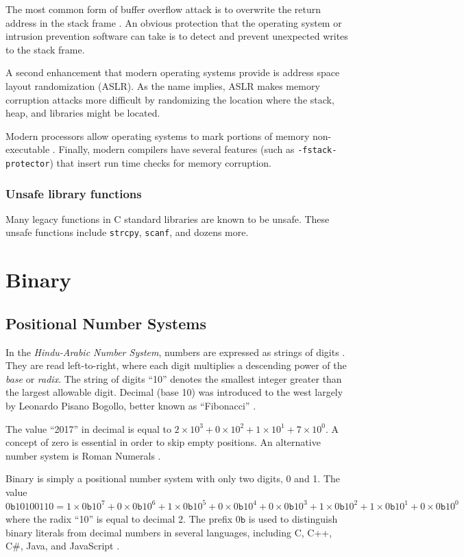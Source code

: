 \documentclass{book}
\begin{document}
The most common form of buffer overflow attack is to overwrite the return address in the stack frame \cite{apple}. An obvious protection that the operating system or intrusion prevention software can take is to detect and prevent unexpected writes to the stack frame.

A second enhancement that modern operating systems provide is address space layout randomization (ASLR). As the name implies, ASLR makes memory corruption attacks more difficult by randomizing the location where the stack, heap, and libraries might be located.

Modern processors allow operating systems to mark portions of memory non-executable \cite{apple}. Finally, modern compilers have several features (such as \texttt{-fstack-protector}) that insert run time checks for memory corruption.

\subsection{Unsafe library functions}
Many legacy functions in C standard libraries are known to be unsafe. These unsafe functions include \texttt{strcpy}, \texttt{scanf}, and dozens more.

\chapter{Binary}

\section{Positional Number Systems}
In the \textit{Hindu-Arabic Number System}, numbers are expressed as strings of digits \cite{ji_2010}. They are read left-to-right, where each digit multiplies a descending power of the \textit{base} or \textit{radix}. The string of digits ``10'' denotes the smallest integer greater than the largest allowable digit. Decimal (base 10) was introduced to the west largely by Leonardo Pisano Bogollo, better known as ``Fibonacci'' \cite{seligman_2011} \cite{mastin_2010}.

The value ``2017'' in decimal is equal to $2 \times 10^3 + 0 \times 10^2 + 1 \times 10^1 + 7 \times 10^0$. A concept of zero is essential in order to skip empty positions. An alternative number system is Roman Numerals \cite{ji_2010}.

Binary is simply a positional number system with only two digits, 0 and 1. The value $0\texttt{b}10100110 = 1 \times 0\texttt{b}10^7 + 0 \times 0\texttt{b}10^6 + 1 \times 0\texttt{b}10^5 + 0 \times 0\texttt{b}10^4 + 0 \times 0\texttt{b}10^3 + 1 \times 0\texttt{b}10^2 + 1 \times 0\texttt{b}10^1 + 0 \times 0\texttt{b}10^0$ where the radix ``10'' is equal to decimal 2. The prefix $0\texttt{b}$ is used to distinguish binary literals from decimal numbers in several languages, including C, C++, C\#, Java, and JavaScript \cite{oracle_binary_literal}.
\end{document}
